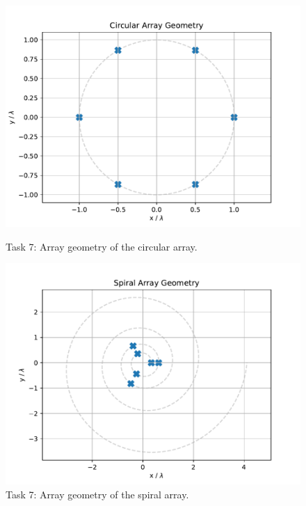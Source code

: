 \begin{figure}
    \centering
    \begin{minipage}{0.48\textwidth}
        \centering
        \includegraphics[width=1.0\textwidth]{graphics/t7/t7-geo-circ.pdf} %
        \caption{Task 7: Array geometry of the circular array.}
        \label{fig:t7-geo-circ}
    \end{minipage}\hfill
    \begin{minipage}{0.48\textwidth}
        \centering
        \includegraphics[width=1\textwidth]{graphics/t7/t7-geo-spir.pdf} %
        \caption{Task 7: Array geometry of the spiral array.}
        \label{fig:t7-geo-spir}
    \end{minipage}
\end{figure}

